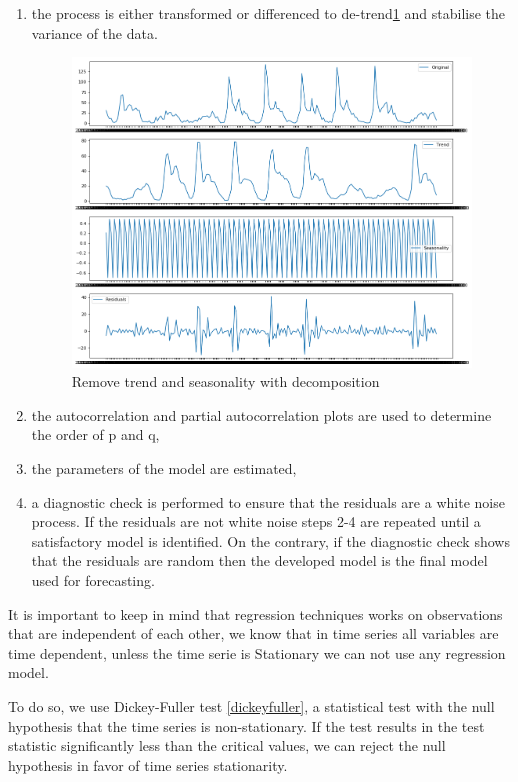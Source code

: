 \begin{enumerate}
    \item  the process is either transformed or
differenced to de-trend\ref{fig:detrend} and stabilise the variance of the data.
 

\begin{figure}[H]
\centering
\includegraphics[scale=.4]{img/detreding.png} 
\caption{Remove trend and seasonality with decomposition }
\label{fig:detrend}
\end{figure}

\item the autocorrelation and partial autocorrelation plots are used to determine the order of p and q,
\item the parameters of the model are estimated,
\item a diagnostic check is performed to ensure that the residuals are a white noise process. If the residuals are not white noise steps 2-4 are repeated until a satisfactory model is identified. On the contrary, if the diagnostic check shows that the residuals are random then the developed model is the final model used for forecasting.
\end{enumerate}

It is important to keep in mind that regression techniques works on  observations that are independent of each other, we know that in time series all variables are time dependent, unless the time serie is Stationary we can not use any regression model.

To do so, we use  Dickey-Fuller test \ref{dickeyfuller}, a statistical test with the null hypothesis that the time series is non-stationary. If the test results in the test statistic significantly less than the critical values, we can reject the null hypothesis in favor of time series stationarity.

